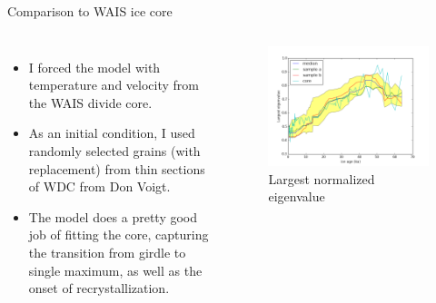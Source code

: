 \documentclass{beamer}
\begin{document}
\begin{frame}{Comparison to WAIS ice core}
   \begin{columns}[T]
   \begin{itemize}
      \item I forced the model with temperature and velocity from the WAIS divide core.
      \item As an initial condition, I used randomly selected grains (with replacement) from thin sections of WDC from Don Voigt.
      \item The model does a pretty good job of fitting the core, capturing the transition from girdle to single maximum, as well as the onset of recrystallization.
   \end{itemize}
   \begin{figure}
   \includegraphics[width=1\textwidth]{good_fit}
   \caption{Largest normalized eigenvalue}
\end{figure}
\end{columns}
\end{frame}
\end{document}
